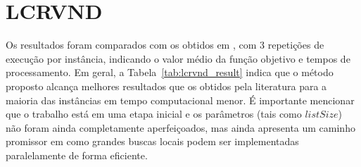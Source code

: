 \section{LCRVND} \label{sec:res_lcrvnd}

Os resultados foram comparados com os obtidos em \cite{Oliveira:2015}, com 3 repetições de execução por instância, indicando o valor médio da função objetivo e tempos de processamento.
Em geral, a Tabela~\ref{tab:lcrvnd_result} indica que o método proposto alcança melhores resultados que os obtidos pela literatura para a maioria das instâncias em tempo computacional menor.
É importante mencionar que o trabalho está em uma etapa inicial e os parâmetros (tais como $listSize$) não foram ainda completamente aperfeiçoados, mas ainda apresenta um caminho promissor em como grandes buscas locais podem ser implementadas paralelamente de forma eficiente.

